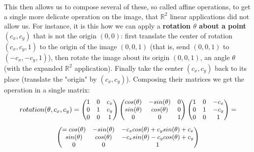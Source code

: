 \documentclass[11pt, a4paper, twoside]{article} %
\newcommand{\R}{\mathbb{R}} %
\begin{document}
{This then allows us to compose several of these, so called affine operations, to get a single more delicate operation on the image, that $\R^2$ linear applications did not allow us. For instance, it is this how we can apply a {\bf rotation $\theta$ about a point $(c_x,c_y)$} that is not the origin $(0,0)$: first translate the center of rotation $(c_x,c_y,1)$ to the origin of the image $(0,0,1)$ (that is, send $(0,0,1)$ to $(-c_x,-c_y,1)$), then rotate the image about its origin $(0,0,1)$, an angle $\theta$ (with the expanded $\R^2$ application). Finally take the center $(c_x,c_y)$ back to its place (translate the "origin" by $(c_x,c_y)$). Composing their matrices we get the operation in a single matrix:
\begin{equation}\small
rotation(\theta, c_x,c_y) = \begin{pmatrix}
1 & 0 & c_x\\
0 & 1 & c_y\\
0 & 0 & 1
\end{pmatrix}\begin{pmatrix}
cos(\theta) & -sin(\theta) & 0\\
sin(\theta) & cos(\theta) & 0\\
0 & 0 & 1
\end{pmatrix}\begin{pmatrix}
1 & 0 & -c_x\\
0 & 1 & -c_y\\
0 & 0 & 1
\end{pmatrix}=
\end{equation}
\begin{equation}
\small\begin{pmatrix}
=cos(\theta) & -sin(\theta) & -c_xcos(\theta)+c_ysin(\theta)+c_x\\
sin(\theta) & cos(\theta) & -c_xsin(\theta)-c_ycos(\theta)+c_y\\
0 & 0 & 1
\end{pmatrix}
\end{equation}
}
\end{document}
